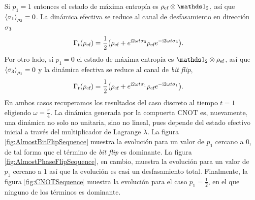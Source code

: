 Si $p_{1}=1$ entonces el estado de máxima entropía es $\rho_{\ef}\otimes\Id_{2}$, así que $\expval{\sigma_{1}}_{\rho_{2}}=0$. La dinámica efectiva se reduce al canal de desfasamiento en dirección $\sigma_{3}$
\begin{equation*}
  \Gamma_{t}(\rho_{\text{ef}})=\frac{1}{2}\qty(\rho_{\text{ef}}+e^{\text{i} 2\omega t \sigma_{3}}\rho_{\text{ef}}e^{-\text{i} 2\omega t \sigma_{3}}).
\end{equation*}
Por otro lado, si $p_{1}=0$ el estado de máxima entropía es $\Id_{2}\otimes\rho_{\ef}$, así que $\expval{\sigma_{3}}_{\rho_{1}}=0$ y la dinámica efectiva se reduce al canal de \textit{bit flip},
\begin{equation*}
  \Gamma_{t}(\rho_{\text{ef}})=\frac{1}{2}\qty(\rho_{\text{ef}}+e^{\text{i} 2\omega t \sigma_{1}}\rho_{\text{ef}}e^{-\text{i} 2\omega t \sigma_{1}}).
\end{equation*}
En ambos casos recuperamos los resultados del caso discreto al tiempo $t=1$ eligiendo $\omega=\frac{\pi}{4}$. La dinámica generada por la compuerta CNOT es, nuevamente, una dinámica no solo no unitaria, sino no lineal, pues depende del estado efectivo inicial a través del multiplicador de Lagrange $\lambda$. La figura \ref{fig:AlmostBitFlipSequence} muestra la evolución para un valor de $p_{1}$ cercano a $0$, de tal forma que el término de \textit{bit flip} es dominante. La figura \ref{fig:AlmostPhaseFlipSequence}, en cambio, muestra la evolución para un valor de $p_{1}$ cercano a $1$ así que la evolución es casi un desfasamiento total. Finalmente, la figura \ref{fig:CNOTSequence} muestra la evolución para el caso $p_{1}=\frac{1}{2}$, en el que ninguno de los términos es dominante.
